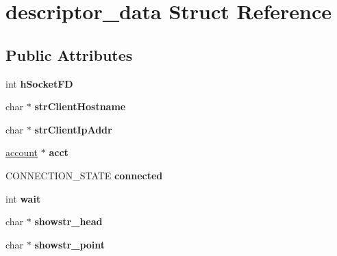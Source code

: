 \hypertarget{structdescriptor__data}{\section{descriptor\-\_\-data Struct Reference}
\label{structdescriptor__data}
}
\subsection*{Public Attributes}
\begin{DoxyCompactItemize}
\item 
\hypertarget{structdescriptor__data_a796b6146ab65b5bae1422c6f0833be6e}{int {\bfseries h\-Socket\-F\-D}}\label{structdescriptor__data_a796b6146ab65b5bae1422c6f0833be6e}

\item 
\hypertarget{structdescriptor__data_a07f8f445fc74f6b4c7c9889fe29f1d6a}{char $\ast$ {\bfseries str\-Client\-Hostname}}\label{structdescriptor__data_a07f8f445fc74f6b4c7c9889fe29f1d6a}

\item 
\hypertarget{structdescriptor__data_a30abed2465d987f5b96ead979106184f}{char $\ast$ {\bfseries str\-Client\-Ip\-Addr}}\label{structdescriptor__data_a30abed2465d987f5b96ead979106184f}

\item 
\hypertarget{structdescriptor__data_a1224d9582f87f982f8a763104818f777}{\hyperlink{classaccount}{account} $\ast$ {\bfseries acct}}\label{structdescriptor__data_a1224d9582f87f982f8a763104818f777}

\item 
\hypertarget{structdescriptor__data_a877c67e191b22b292a8042c3f19904c8}{C\-O\-N\-N\-E\-C\-T\-I\-O\-N\-\_\-\-S\-T\-A\-T\-E {\bfseries connected}}\label{structdescriptor__data_a877c67e191b22b292a8042c3f19904c8}

\item 
\hypertarget{structdescriptor__data_afc7b938bbe08cdfb70ee8c7dab22b386}{int {\bfseries wait}}\label{structdescriptor__data_afc7b938bbe08cdfb70ee8c7dab22b386}

\item 
\hypertarget{structdescriptor__data_a98b3190f073a34db5ea45829482c11de}{char $\ast$ {\bfseries showstr\-\_\-head}}\label{structdescriptor__data_a98b3190f073a34db5ea45829482c11de}

\item 
\hypertarget{structdescriptor__data_ad7526788b6c074cfe633b2dff9164e83}{char $\ast$ {\bfseries showstr\-\_\-point}}\label{structdescriptor__data_ad7526788b6c074cfe633b2dff9164e83}


\end{DoxyCompactItemize}
